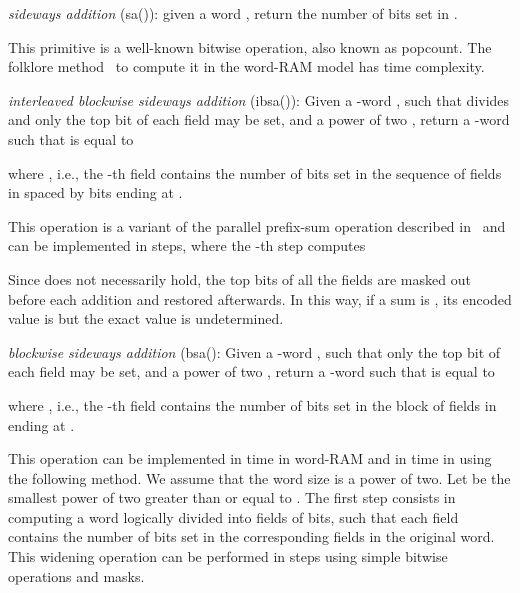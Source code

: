 \documentclass{llncs}
\newcommand{\fsize}{f}
\newcommand{\fword}[1]{-word}
\begin{document}
\medskip
\noindent\emph{sideways addition} (\textsf{sa}()): given a word ,
return the number of bits set in .
\smallskip

\noindent This primitive is a well-known bitwise operation, also known
as popcount. The folklore
method~\cite{DBLP:conf/wea/Vigna08}
to compute it in the word-RAM model has  time complexity.

\medskip
\noindent\emph{interleaved blockwise sideways addition} (\textsf{ibsa}()):
Given a \fword{\fsize} , such that  divides  and
only the top bit of each field may be set, and a power of two ,
return a \fword{\fsize}  such that  is equal to

where , i.e., the -th field contains the
number of bits set in the sequence of 
fields in  spaced by  bits ending at .
\smallskip

\noindent This operation is a variant of the parallel prefix-sum operation
described in~\cite{HS1986} and can be implemented in 
steps, where the -th step computes

Since  does not necessarily hold, the top
bits of all the fields are masked out before each addition and
restored afterwards. In this way, if a sum is , its
encoded value is  but the exact value is
undetermined.

\medskip
\noindent\emph{blockwise sideways addition} (\textsf{bsa}(): Given a \fword{\fsize} , such that only
the top bit of each field may be set, and a power of two ,
return a \fword{b\fsize}  such that  is equal to

where , i.e., the
-th field contains the number of bits set in the block of
 fields in  ending at .
\smallskip

\noindent This operation can be implemented in time  in word-RAM and in time  in
 using the following method. We assume that the word size  is
a power of two.
Let  be the smallest power of two greater than or equal to
. The first step consists in computing a word logically
divided into fields of  bits, such that each
field contains the number of bits set in the corresponding
 fields in the original word. This widening
operation can be performed in  steps using simple bitwise operations and  masks.
\end{document}
